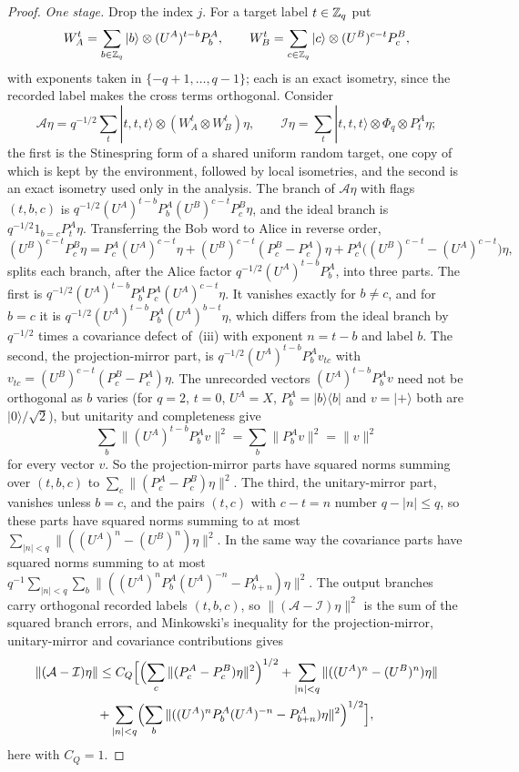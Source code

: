 \begin{proof}
\emph{One stage.} Drop the index $j$. For a target label $t\in\mathbb Z_q$ put
\[
W_A^t=\sum_{b\in\mathbb Z_q}|b\rangle\otimes(U^A)^{t-b}P^A_b,\qquad W_B^t=\sum_{c\in\mathbb Z_q}|c\rangle\otimes(U^B)^{c-t}P^B_c ,
\]
with exponents taken in $\{-q+1,\dots,q-1\}$; each is an exact isometry, since the recorded label makes the cross terms orthogonal.
Consider
\[
\mathcal A\eta=q^{-1/2}\sum_t|t,t,t\rangle\otimes(W_A^t\otimes W_B^t)\eta,\qquad\mathcal I\eta=\sum_t|t,t,t\rangle\otimes\Phi_q\otimes P^A_t\eta ;
\]
the first is the Stinespring form of a shared uniform random target, one copy of which is kept by the environment, followed by local
isometries, and the second is an exact isometry used only in the analysis. The branch of $\mathcal A\eta$ with flags $(t,b,c)$ is
$q^{-1/2}(U^A)^{t-b}P^A_b(U^B)^{c-t}P^B_c\eta$, and the ideal branch is $q^{-1/2}1_{b=c}P^A_t\eta$. Transferring the Bob word to Alice in
reverse order,
\[
(U^B)^{c-t}P^B_c\eta=P^A_c(U^A)^{c-t}\eta+(U^B)^{c-t}(P^B_c-P^A_c)\eta+P^A_c\bigl((U^B)^{c-t}-(U^A)^{c-t}\bigr)\eta ,
\]
splits each branch, after the Alice factor $q^{-1/2}(U^A)^{t-b}P^A_b$, into three parts. The first is $q^{-1/2}(U^A)^{t-b}P^A_bP^A_c(U^A)^{c-t}\eta$.
It vanishes exactly for $b\ne c$, and for $b=c$ it is $q^{-1/2}(U^A)^{t-b}P^A_b(U^A)^{b-t}\eta$, which differs from the ideal branch by $q^{-1/2}$
times a covariance defect of~(iii) with exponent $n=t-b$ and label $b$. The second, the projection-mirror part, is
$q^{-1/2}(U^A)^{t-b}P^A_bv_{tc}$ with $v_{tc}=(U^B)^{c-t}(P^B_c-P^A_c)\eta$. The unrecorded vectors $(U^A)^{t-b}P^A_bv$ need not be orthogonal
as $b$ varies (for $q=2$, $t=0$, $U^A=X$, $P^A_b=|b\rangle\langle b|$ and $v=|{+}\rangle$ both are $|0\rangle/\sqrt2$), but unitarity and
completeness give
\[
\sum_b\|(U^A)^{t-b}P^A_bv\|^2=\sum_b\|P^A_bv\|^2=\|v\|^2
\]
for every vector $v$. So the projection-mirror parts have squared norms summing over $(t,b,c)$ to $\sum_c\|(P^A_c-P^B_c)\eta\|^2$. The third,
the unitary-mirror part, vanishes unless $b=c$, and the pairs $(t,c)$ with $c-t=n$ number $q-|n|\le q$, so these parts have squared norms
summing to at most $\sum_{|n|<q}\|((U^A)^n-(U^B)^n)\eta\|^2$. In the same way the covariance parts have squared norms summing to at most
$q^{-1}\sum_{|n|<q}\sum_b\|((U^A)^nP^A_b(U^A)^{-n}-P^A_{b+n})\eta\|^2$. The output branches carry orthogonal recorded labels $(t,b,c)$, so
$\|(\mathcal A-\mathcal I)\eta\|^2$ is the sum of the squared branch errors, and Minkowski's inequality for the projection-mirror, unitary-mirror
and covariance contributions gives
\begin{multline}\label{eq:cyc-stage}
\|(\mathcal A-\mathcal I)\eta\|\le C_Q\Bigl[\Bigl(\sum_c\|(P^A_c-P^B_c)\eta\|^2\Bigr)^{1/2}+\sum_{|n|<q}\|((U^A)^n-(U^B)^n)\eta\|\\
+\sum_{|n|<q}\Bigl(\sum_b\|((U^A)^nP^A_b(U^A)^{-n}-P^A_{b+n})\eta\|^2\Bigr)^{1/2}\Bigr],
\end{multline}
here with $C_Q=1$.


\end{proof}
